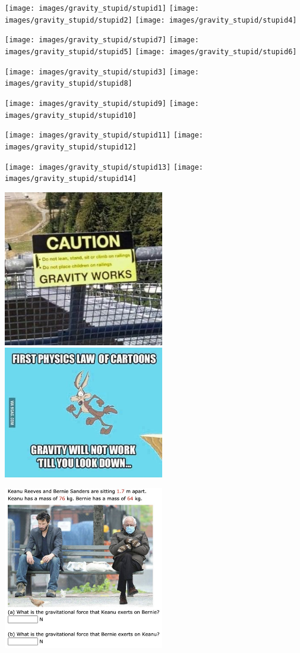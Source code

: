 
\texttt{[image: images/gravity\_stupid/stupid1]}
\texttt{[image: images/gravity\_stupid/stupid2]}
\texttt{[image: images/gravity\_stupid/stupid4]}

\texttt{[image: images/gravity\_stupid/stupid7]}
\texttt{[image: images/gravity\_stupid/stupid5]}
\texttt{[image: images/gravity\_stupid/stupid6]}

\texttt{[image: images/gravity\_stupid/stupid3]}
\texttt{[image: images/gravity\_stupid/stupid8]}

\texttt{[image: images/gravity\_stupid/stupid9]}
\texttt{[image: images/gravity\_stupid/stupid10]}

\texttt{[image: images/gravity\_stupid/stupid11]}
\texttt{[image: images/gravity\_stupid/stupid12]}

\texttt{[image: images/gravity\_stupid/stupid13]}
\texttt{[image: images/gravity\_stupid/stupid14]}

\includegraphics[width=7cm]{images/gravity_stupid/stupid15}
\includegraphics[width=7cm]{images/gravity_stupid/stupid16}

\includegraphics[width=7cm]{images/gravity_stupid/stupid17}
